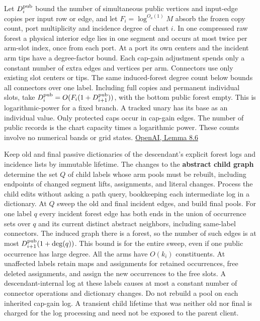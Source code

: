 \documentclass[11pt]{article}
\begin{document}
Let \(D_i^{\rm pub}\) bound the number of simultaneous public vertices and input-edge copies per input row or edge, and let \(F_i=\log^{O_a(1)}M\) absorb the frozen copy count, port multiplicity and incidence degree of chart \(i\). In one compressed raw forest a physical interior edge lies in one segment and occurs at most twice per arm-slot index, once from each port. At a port its own centers and the incident arm tips have a degree-factor bound. Each cap-gain adjustment spends only a constant number of extra edges and vertices per arm. Connectors use only existing slot centers or tips. The same induced-forest degree count below bounds all connectors over one label. Including full copies and permanent individual slots, take \(D_i^{\rm pub}=O(F_i(1+D_{i+1}^{\rm pub}))\), with the bottom public forest empty. This is logarithmic-power for a fixed branch. A tracked unary has its base as an individual value. Only protected caps occur in cap-gain edges. The number of public records is the chart capacity times a logarithmic power. These counts involve no numerical bands or grid states. \href{https://raw.githubusercontent.com/openai/math/adc7f1241b42e322a6451854ab7e4b4c146bf78a/preprints/Almost-Linear-Time-Maximum-Cardinality-Matching-in-Sparse-General-Graphs-September-24-2026/main.pdf\#page=71}{OpenAI, Lemma 8.6}

Keep old and final passive dictionaries of the descendant's explicit forest logs and incidence lists by immutable lifetime. The changes to the \textbf{abstract child graph} determine the set \(Q\) of child labels whose arm pools must be rebuilt, including endpoints of changed segment lifts, assignments, and literal changes. Process the child edits without asking a path query, bookkeeping each intermediate log in a dictionary. At \(Q\) sweep the old and final incident edges, and build final pools. For one label \(q\) every incident forest edge has both ends in the union of occurrence sets over \(q\) and its current distinct abstract neighbors, including same-label connectors. The induced graph there is a forest, so the number of such edges is at most \(D_{i+1}^{\rm pub}(1+\deg(q))\). This bound is for the entire sweep, even if one public occurrence has large degree. All the arms have \(O(k_i)\) constituents. At unaffected labels retain maps and assignments for retained occurrences, free deleted assignments, and assign the new occurrences to the free slots. A descendant-internal log at these labels causes at most a constant number of connector operations and dictionary changes. Do not rebuild a pool on each inherited cap-gain log. A transient child lifetime that was neither old nor final is charged for the log processing and need not be exposed to the parent client.
\end{document}

